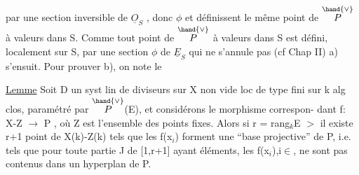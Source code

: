 
par une section inversible de $\underline{O}_S$ , donc $\phi$ et \unsure{$\psi$} définissent le même point
de $\overset{\hand{\vee}}{P}$ à valeurs dans S. Comme tout point de $\overset{\hand{\vee}}{P}$ à valeurs dans S est défini,
localement sur S, par une section $\phi$ de $\underline{E}_S$ qui ne s'annule pas (cf Chap II)
a) s'ensuit.   Pour prouver b), on note le

\uline{Lemme}   Soit D un syst lin de diviseurs sur X non vide loc de type fini
sur k alg clos, paramétré par $\overset{\hand{\vee}}{P}$(E), et considérons le morphisme correspon-%
dant  f: X-Z $\longrightarrow$ P , où Z est l'ensemble des points fixes. Alors  si
r = rang$_k$E $>$ il existe  r+1 point de  X(k)-Z(k)  tels que les
f(x$_i$) forment une  ``base projective'' de P, i.e. tels que  pour toute
partie J de [1,r+1] ayant   éléments,  les  f(x$_i$),i$\in$,  ne sont pas
contenus dans un hyperplan de P.

